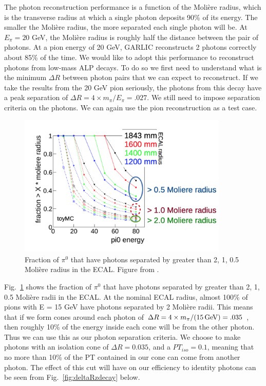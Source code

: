 \documentclass[aps,onecolumn,twoside,secnumarabic,12pt,balancelastpage,amsmath,amssymb,nofootinbib,hyperref=pdftex]{revtex4}
\begin{document}
The photon reconstruction performance is a function of the Moli\`ere radius, which is the transverse radius at which a single photon deposits 90\% of its energy. The smaller the Moli\`ere radius, the more separated each single photon will be. At $E_{\pi} = 20$ GeV, the Moli\`ere radius is roughly half the distance between the pair of photons. At a pion energy of 20 GeV, GARLIC reconstructs 2 photons correctly about 85\% of the time.
\vskip 0.12in
We would like to adopt this performance to reconstruct photons from low-mass ALP decays. To do so we first need to understand what is the minimum $\Delta R$ between photon pairs that we can expect to reconstruct. If we take the results from the 20 GeV pion seriously, the photons from this decay have a peak separation of $\Delta R = 4\times m_{\pi}/E_{\pi} = .027$. We still need to impose separation criteria on the photons. We can again use the pion reconstruction as a test case.
\begin{figure}[t]
\begin{center}
\includegraphics[width=10cm]{separation.png}
\caption{Fraction of $\pi^{0}$ that have photons separated by greater than 2, 1, 0.5 Moli\`ere radius in the ECAL. Figure from \cite{Jeans:2012jj}.}
\label{fig:separation}
\end{center}
\end{figure}
Fig.~\ref{fig:separation} shows the fraction of $\pi^{0}$ that have photons separated by greater than 2, 1, 0.5 Moli\`ere radii in the ECAL. At the nominal ECAL radius, almost 100\% of pions with E = 15 GeV have photons separated by 2 Moli\`ere radii. This means that if we form cones around each photon of $\Delta R = 4\times m_{\pi}/(15\,\rm{GeV}) = .035$ \cite{Aaboud:2018djx}, then roughly 10\% of the energy inside each cone will be from the other photon. Thus we can use this as our photon separation criteria.
\vskip 0.12in
We choose to make photons with an isolation cone of $\Delta R = 0.035$, and a $PT_{iso} = 0.1$, meaning that no more than 10\% of the PT contained in our cone can come from another photon. The effect of this cut will have on our efficiency to identity photons can be seen from Fig.~\ref{fig:deltaRzdecay} below.
\end{document}
